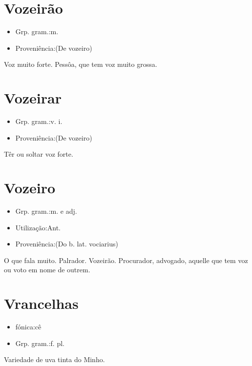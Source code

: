 \documentclass{article}
\begin{document}
\section{Vozeirão}
\begin{itemize}
\item {Grp. gram.:m.}
\end{itemize}
\begin{itemize}
\item {Proveniência:(De \textunderscore vozeiro\textunderscore )}
\end{itemize}
Voz muito forte.
Pessôa, que tem voz muito grossa.
\section{Vozeirar}
\begin{itemize}
\item {Grp. gram.:v. i.}
\end{itemize}
\begin{itemize}
\item {Proveniência:(De \textunderscore vozeiro\textunderscore )}
\end{itemize}
Têr ou soltar voz forte.
\section{Vozeiro}
\begin{itemize}
\item {Grp. gram.:m.  e  adj.}
\end{itemize}
\begin{itemize}
\item {Utilização:Ant.}
\end{itemize}
\begin{itemize}
\item {Proveniência:(Do b. lat. \textunderscore vociarius\textunderscore )}
\end{itemize}
O que fala muito.
Palrador.
Vozeirão.
Procurador, advogado, aquelle que tem voz ou voto em nome de outrem.
\section{Vrancelhas}
\begin{itemize}
\item {fónica:cê}
\end{itemize}
\begin{itemize}
\item {Grp. gram.:f. pl.}
\end{itemize}
Variedade de uva tinta do Minho.
\end{document}

